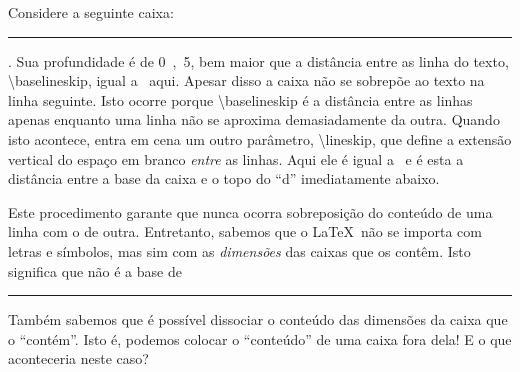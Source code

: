 \documentclass[a4paper,12pt]{article}
\newcommand{\comando}[1]{{\normalfont\textbackslash\color{blue!50!black}#1}}
\begin{document}
	Considere a seguinte caixa: \rule[-0.5cm]{2ex}{2ex}. Sua profundidade é de \unit{0,5}{\centi\metre}, bem maior que a distância entre as linha do texto, \comando{baselineskip}, igual a \the\baselineskip\ aqui. Apesar disso a caixa não se sobrepõe ao texto na linha seguinte. Isto ocorre porque \comando{baselineskip} é a distância entre as linhas apenas enquanto uma linha não se aproxima demasiadamente da outra. Quando isto acontece, entra em cena um outro parâmetro, \comando{lineskip}, que define a extensão vertical do espaço em branco \emph{entre} as linhas. Aqui ele é igual a \the\lineskip\ e é esta a distância entre a base da caixa e o topo do ``d'' imediatamente abaixo.

	

	Este procedimento garante que nunca ocorra sobreposição do conteúdo de uma linha com o de outra. Entretanto, sabemos que o \LaTeX\ não se importa com letras e símbolos, mas sim com as \emph{dimensões} das caixas que os contêm. Isto significa que não é a base de \rule{2ex}{2ex}

	

	

	 Também sabemos que é possível dissociar o conteúdo das dimensões da caixa que o ``contém''. Isto é, podemos colocar o ``conteúdo'' de uma caixa fora dela! E o que aconteceria neste caso?
\end{document}

